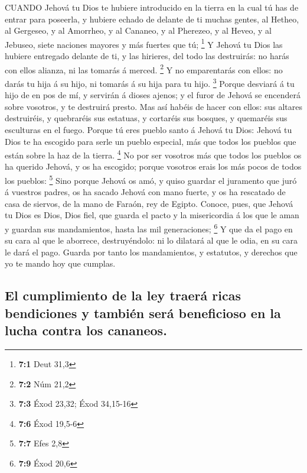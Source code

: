  CUANDO Jehová tu Dios te hubiere introducido en la tierra
en la cual tú has de entrar para poseerla, y hubiere echado de delante
de ti muchas gentes, al Hetheo, al Gergeseo, y al Amorrheo, y al
Cananeo, y al Pherezeo, y al Heveo, y al Jebuseo, siete naciones mayores
y más fuertes que tú; \footnote{\textbf{7:1} Deut 31,3}  Y
Jehová tu Dios las hubiere entregado delante de ti, y las hirieres, del
todo las destruirás: no harás con ellos alianza, ni las tomarás á
merced. \footnote{\textbf{7:2} Núm 21,2}  Y no emparentarás
con ellos: no darás tu hija á su hijo, ni tomarás á su hija para tu
hijo. \footnote{\textbf{7:3} Éxod 23,32; Éxod 34,15-16} 
Porque desviará á tu hijo de en pos de mí, y servirán á dioses ajenos; y
el furor de Jehová se encenderá sobre vosotros, y te destruirá presto.
 Mas así habéis de hacer con ellos: sus altares destruiréis,
y quebraréis sus estatuas, y cortaréis sus bosques, y quemaréis sus
esculturas en el fuego.  Porque tú eres pueblo santo á
Jehová tu Dios: Jehová tu Dios te ha escogido para serle un pueblo
especial, más que todos los pueblos que están sobre la haz de la tierra.
\footnote{\textbf{7:6} Éxod 19,5-6}  No por ser vosotros más
que todos los pueblos os ha querido Jehová, y os ha escogido; porque
vosotros erais los más pocos de todos los pueblos: \footnote{\textbf{7:7}
  Efes 2,8}  Sino porque Jehová os amó, y quiso guardar el
juramento que juró á vuestros padres, os ha sacado Jehová con mano
fuerte, y os ha rescatado de casa de siervos, de la mano de Faraón, rey
de Egipto.  Conoce, pues, que Jehová tu Dios es Dios, Dios
fiel, que guarda el pacto y la misericordia á los que le aman y guardan
sus mandamientos, hasta las mil generaciones; \footnote{\textbf{7:9}
  Éxod 20,6}  Y que da el pago en su cara al que le
aborrece, destruyéndolo: ni lo dilatará al que le odia, en su cara le
dará el pago.  Guarda por tanto los mandamientos, y
estatutos, y derechos que yo te mando hoy que cumplas.

\hypertarget{el-cumplimiento-de-la-ley-traeruxe1-ricas-bendiciones-y-tambiuxe9n-seruxe1-beneficioso-en-la-lucha-contra-los-cananeos.}{%
\subsection{El cumplimiento de la ley traerá ricas bendiciones y también
será beneficioso en la lucha contra los
cananeos.}\label{el-cumplimiento-de-la-ley-traeruxe1-ricas-bendiciones-y-tambiuxe9n-seruxe1-beneficioso-en-la-lucha-contra-los-cananeos.}}

